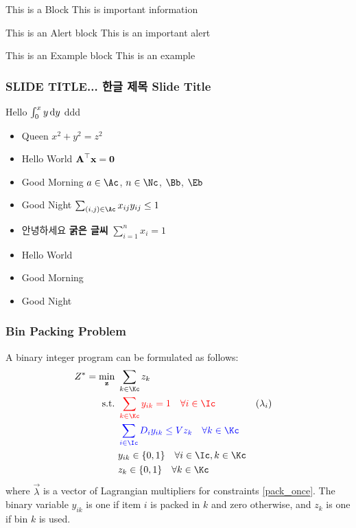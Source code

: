 \begin{frame}

   \begin{block}{This is a Block}
      This is important information
   \end{block}

\pause

   \begin{alertblock}{This is an Alert block}
   This is an important alert
   \end{alertblock}

\pause

   \begin{exampleblock}{This is an Example block}
   This is an example 
   \end{exampleblock}

\end{frame}


\begin{frame}
\frametitle{SLIDE TITLE... 한글 제목 Slide Title}

Hello $\int_0^x y \mathop{}\!\mathrm{d}y$ \alert<2>{ddd}
\begin{itemize}
\item Queen $x^2 + y^2 = z^2$
\item Hello World $\boldsymbol{\mathbf{A}}^\top \boldsymbol{\mathbf{x}} = \boldsymbol{\mathbf{0}}$
\item Good Morning $a\in\Ac$, $n\in\Nc$, $\Bb$, $\Eb$
\item Good Night $\sum_{(i,j)\in\Ac} x_{ij} y_{ij} \leq 1$ 
\item 안녕하세요 \textbf{굵은 글씨} $\textstyle\sum_{i=1}^n x_i = 1$
\end{itemize}

\begin{itemize}
\item<1-> Hello \alert{World}
\item<2-> Good \alert{Morning}
\item<3-> Good \alert{Night}
\end{itemize}

\end{frame}


\begin{frame}
\frametitle{\comet Bin Packing Problem}
A binary integer program can be formulated as follows:
\begin{align}
Z^* = \min_{\vec{z}} \ & \sum_{k\in\Kc} z_k \\
\text{s.t.} \ 
& \color{red}\sum_{k\in\Kc} y_{ik} = 1 \quad \forall i\in\Ic && (\lambda_i) \label{pack_once} \\
& \color{blue}\sum_{i\in\Ic} D_i y_{ik} \leq V z_k \quad \forall k\in\Kc \\
& y_{ik} \in \{0, 1\} \quad \forall i\in\Ic, k\in\Kc\\
& z_k \in \{0, 1\} \quad \forall k\in\Kc
\end{align}
where $\vec{\lambda}$ is a vector of Lagrangian multipliers for constraints \eqref{pack_once}.
The binary variable $y_{ik}$ is one if item $i$ is packed in $k$ and zero otherwise, and $z_k$ is one if bin $k$ is used.

\end{frame}




